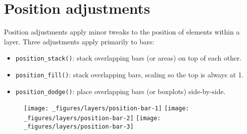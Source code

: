 \hypertarget{sec:position}{\section{Position
adjustments}\label{sec:position}}


Position adjustments apply minor tweaks to the position of elements
within a layer. Three adjustments apply primarily to bars:

 
  

\begin{itemize}
\tightlist
\item
  \texttt{position\_stack()}: stack overlapping bars (or areas) on top
  of each other.
\item
  \texttt{position\_fill()}: stack overlapping bars, scaling so the top
  is always at 1.
\item
  \texttt{position\_dodge()}: place overlapping bars (or boxplots)
  side-by-side.
\end{itemize}

\begin{Shaded}
\begin{Highlighting}[]
\StringTok{ } \StringTok{ }
\StringTok{  }\NormalTok{(}\NormalTok{) +}\StringTok{ }\NormalTok{(}\NormalTok{) +}\StringTok{ }\NormalTok{(} \NormalTok{)}
\StringTok{ }\NormalTok{()}
\StringTok{ }\NormalTok{(} \NormalTok{)}
\StringTok{ }\NormalTok{(} \NormalTok{)}
\end{Highlighting}
\end{Shaded}

\begin{figure}[H]
  \texttt{[image: \_figures/layers/position-bar-1]}%
  \texttt{[image: \_figures/layers/position-bar-2]}%
  \texttt{[image: \_figures/layers/position-bar-3]}
\end{figure}

